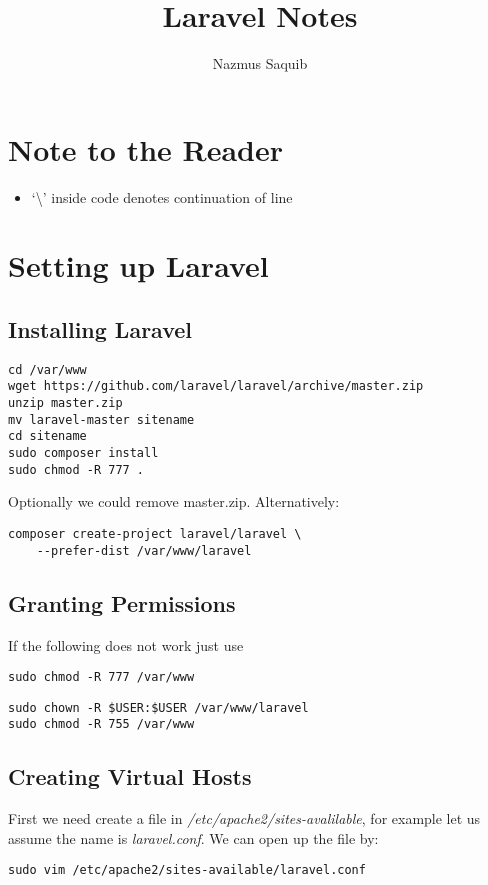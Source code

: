 \documentclass[a4paper, 10pt]{article}
\begin{document}
\title{Laravel Notes}
\author{Nazmus Saquib}

\maketitle
\tableofcontents

\section{Note to the Reader}
\begin{itemize}
    \item `\textbackslash' inside code denotes continuation of line
\end{itemize}

\section{Setting up Laravel}
\subsection{Installing Laravel}
\begin{verbatim}
cd /var/www
wget https://github.com/laravel/laravel/archive/master.zip
unzip master.zip
mv laravel-master sitename
cd sitename
sudo composer install
sudo chmod -R 777 .
\end{verbatim}
Optionally we could remove master.zip.
Alternatively:
\begin{verbatim}
composer create-project laravel/laravel \
    --prefer-dist /var/www/laravel
\end{verbatim}
\subsection{Granting Permissions}
If the following does not work just use

\verb|sudo chmod -R 777 /var/www|
\begin{verbatim}
sudo chown -R $USER:$USER /var/www/laravel
sudo chmod -R 755 /var/www
\end{verbatim}
\subsection{Creating Virtual Hosts}
First we need create a file in \emph{/etc/apache2/sites-avalilable},
for example let us assume the name is \emph{laravel.conf}.
We can open up the file by:
\begin{verbatim}
sudo vim /etc/apache2/sites-available/laravel.conf
\end{verbatim}
\end{document}
